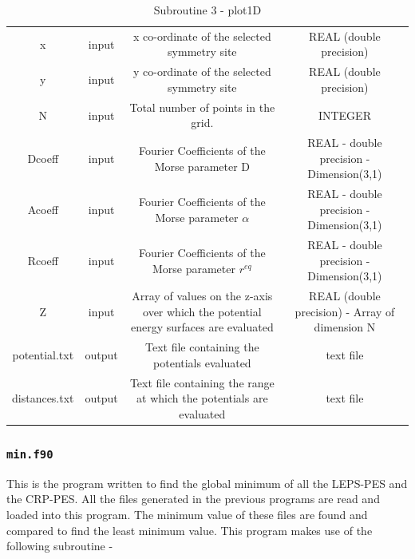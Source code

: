 \documentclass[12pt]{article}
\begin{document}
\begin{enumerate}
\begin{table}[h!]
{\begin{tabular}{cccc}
    x & input & x co-ordinate of the selected symmetry site & REAL (double precision)\\
    y & input & y co-ordinate of the selected symmetry site & REAL (double precision)\\
    N &  input & Total number of points in the grid. & INTEGER\\
    Dcoeff & input & Fourier Coefficients of the Morse parameter D & REAL - double precision - Dimension(3,1)\\
    Acoeff & input & Fourier Coefficients of the Morse parameter $\alpha$ & REAL - double precision - Dimension(3,1)\\
    Rcoeff & input & Fourier Coefficients of the Morse parameter $r^{eq}$ & REAL - double precision - Dimension(3,1)\\ 
    Z & input &Array of values on the z-axis over which the potential energy surfaces are evaluated &  REAL (double precision) - Array of dimension N\\
    potential.txt & output & Text file containing the potentials evaluated & text file \\ 
    distances.txt & output & Text file containing the range at which the potentials are evaluated & text file \\\hline
     
    \end{tabular}}
    \caption{Subroutine 3 - plot1D}
    \end{table} 
\end{enumerate}

\pagebreak
\subsubsection{\textbf{{\texttt{min.f90}}}}

This is the program written to find the global minimum of all the LEPS-PES and the CRP-PES. All the files generated in the previous programs are read and loaded into this program. The minimum value of these files are found and compared to find the least minimum value. This program makes use of the following subroutine -
\end{document}
